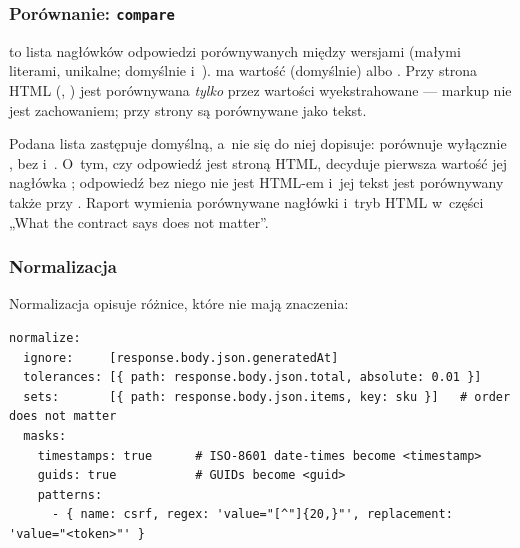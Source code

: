 \subsubsection{Porównanie: \texttt{compare}}

 to lista nagłówków odpowiedzi porównywanych między wersjami
(małymi literami, unikalne; domyślnie  i~).
 ma wartość  (domyślnie) albo . Przy
 strona HTML (, ) jest
porównywana \emph{tylko} przez wartości wyekstrahowane --- markup nie jest zachowaniem; przy
 strony są porównywane jako tekst.

Podana lista  zastępuje domyślną, a~nie się do niej dopisuje:
 porównuje wyłącznie , bez 
i~. O~tym, czy odpowiedź jest stroną HTML, decyduje pierwsza wartość jej
nagłówka ; odpowiedź bez niego nie jest HTML-em i~jej tekst jest
porównywany także przy . Raport wymienia porównywane nagłówki i~tryb HTML
w~części „What the contract says does not matter”.

\subsubsection{Normalizacja}

Normalizacja opisuje różnice, które nie mają znaczenia:

\begin{lstlisting}
normalize:
  ignore:     [response.body.json.generatedAt]
  tolerances: [{ path: response.body.json.total, absolute: 0.01 }]
  sets:       [{ path: response.body.json.items, key: sku }]   # order does not matter
  masks:
    timestamps: true      # ISO-8601 date-times become <timestamp>
    guids: true           # GUIDs become <guid>
    patterns:
      - { name: csrf, regex: 'value="[^"]{20,}"', replacement: 'value="<token>"' }
\end{lstlisting}

